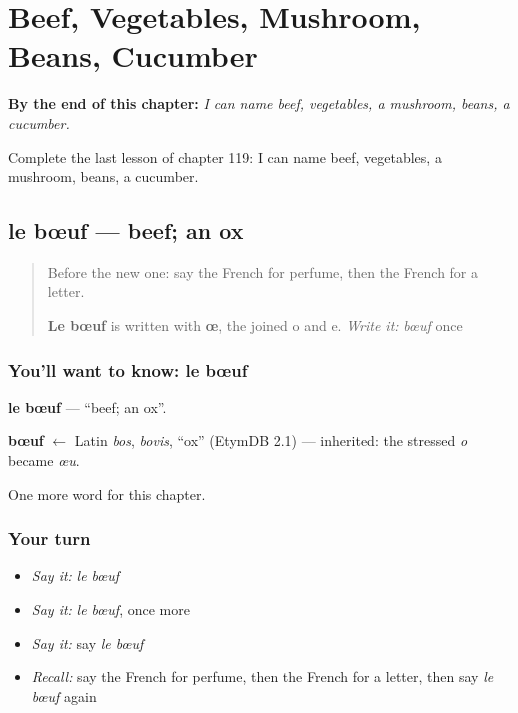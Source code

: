
\chapter{Beef, Vegetables, Mushroom, Beans, Cucumber}
\label{ch:fr-beef-vegetables-mushroom-beans-cucumber}

\begin{chapteropening}
\textbf{By the end of this chapter:} \emph{I can name beef, vegetables, a mushroom, beans, a cucumber.}

Complete the last lesson of chapter 119: I can name beef, vegetables, a mushroom, beans, a cucumber.
\end{chapteropening}

\section[le bœuf]{le bœuf — beef; an ox}

\label{lesson:FR-C119-boeuf}



\begin{quote}
Before the new one: say the French for perfume, then the French for a letter.

\textbf{Le bœuf} is written with \textbf{œ}, the joined o and e. \emph{Write it:} \emph{bœuf} once
\end{quote}

\subsection*{You'll want to know: le bœuf}
\textbf{le bœuf} — \textquotedblleft{}beef; an ox\textquotedblright{}.

\begin{cousinweb}
\textbf{bœuf} $\leftarrow$ Latin \emph{bos}, \emph{bovis}, \textquotedblleft{}ox\textquotedblright{} (EtymDB 2.1) — inherited: the stressed \emph{o} became \emph{œu}.
\end{cousinweb}

\begin{grammarlens}[title={What you've built}]
One more word for this chapter.
\end{grammarlens}

\subsection*{Your turn}
\begin{itemize}
\raggedright
  \item \emph{Say it:} \emph{le bœuf}
  \item \emph{Say it:} \emph{le bœuf}, once more
  \item \emph{Say it:} say \emph{le bœuf}
  \item \emph{Recall:} say the French for perfume, then the French for a letter, then say \emph{le bœuf} again
\end{itemize}

